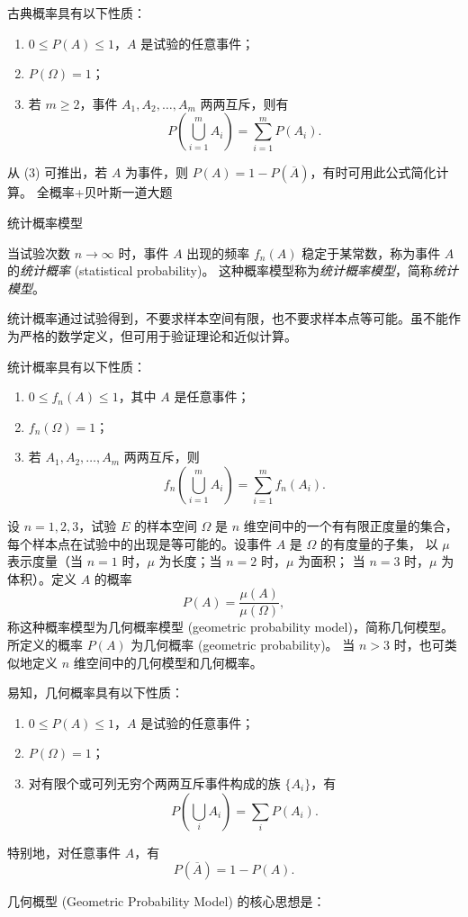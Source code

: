 古典概率具有以下性质：
\begin{enumerate}
  \item $0 \leq P(A) \leq 1$，$A$ 是试验的任意事件；
  \item $P(\Omega)=1$；
  \item 若 $m \geq 2$，事件 $A_1,A_2,\dots,A_m$ 两两互斥，则有
  \[
  P\!\left(\bigcup_{i=1}^m A_i\right) = \sum_{i=1}^m P(A_i).
  \]
\end{enumerate}

从 (3) 可推出，若 $A$ 为事件，则 $P(A)=1-P(\overline{A})$，有时可用此公式简化计算。
全概率+贝叶斯一道大题
\begin{definition}{统计概率模型}  

当试验次数 $n \to \infty$ 时，事件 $A$ 出现的频率 $f_n(A)$ 稳定于某常数，称为事件 $A$ 的\emph{统计概率} (statistical probability)。  
这种概率模型称为\emph{统计概率模型}，简称\emph{统计模型}。  

统计概率通过试验得到，不要求样本空间有限，也不要求样本点等可能。虽不能作为严格的数学定义，但可用于验证理论和近似计算。  

统计概率具有以下性质：  
\begin{enumerate}
  \item $0 \leq f_n(A) \leq 1$，其中 $A$ 是任意事件；
  \item $f_n(\Omega) = 1$；
  \item 若 $A_1, A_2, \dots, A_m$ 两两互斥，则
  \[
  f_n\!\left(\bigcup_{i=1}^m A_i \right) = \sum_{i=1}^m f_n(A_i).
  \]
\end{enumerate}
\end{definition}
\begin{definition}[几何概型]
  设 $n=1,2,3$，试验 $E$ 的样本空间 $\Omega$ 是 $n$ 维空间中的一个有有限正度量的集合，
每个样本点在试验中的出现是等可能的。设事件 $A$ 是 $\Omega$ 的有度量的子集，
以 $\mu$ 表示度量（当 $n=1$ 时，$\mu$ 为长度；当 $n=2$ 时，$\mu$ 为面积；
当 $n=3$ 时，$\mu$ 为体积）。定义 $A$ 的概率
\[
P(A) = \frac{\mu(A)}{\mu(\Omega)},
\]
称这种概率模型为几何概率模型 (geometric probability model)，简称几何模型。
所定义的概率 $P(A)$ 为几何概率 (geometric probability)。
当 $n>3$ 时，也可类似地定义 $n$ 维空间中的几何模型和几何概率。

易知，几何概率具有以下性质：
\begin{enumerate}
  \item $0 \leq P(A) \leq 1$，$A$ 是试验的任意事件；
  \item $P(\Omega) = 1$；
  \item 对有限个或可列无穷个两两互斥事件构成的族 $\{A_i\}$，有
  \[
  P\!\left(\bigcup_i A_i \right) = \sum_i P(A_i).
  \]
\end{enumerate}

特别地，对任意事件 $A$，有
\[
P(\overline{A}) = 1 - P(A).
\]  
\end{definition}几何概型 (Geometric Probability Model) 的核心思想是：
